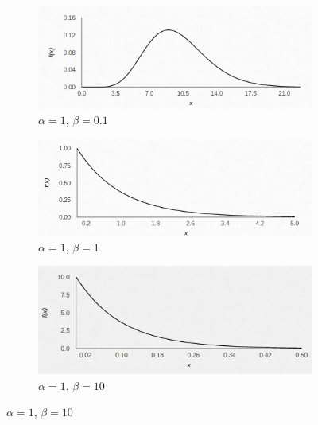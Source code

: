 \documentclass[a4paper,12pt]{article} %
\begin{document}
\begin{figure}[H]
	\begin{subfigure}{.4\textwidth}
		\centering
		\includegraphics[width=.8\linewidth]{Gamma/Gamma_alp1_bet01.png}
		\caption{$\alpha = 1 $, $\beta = 0.1 $}
	\end{subfigure}%
	\begin{subfigure}{.4\textwidth}
		\centering
		\includegraphics[width=.8\linewidth]{Gamma/Gamma_alp1_bet1.png}
		\caption{$\alpha = 1 $, $\beta = 1 $}
	\end{subfigure}%
	
	
	\begin{subfigure}{.4\textwidth}
		\centering
		\includegraphics[width=.8\linewidth]{Gamma/Gamma_alp1_bet10.png}
		\caption{$\alpha = 1 $, $\beta = 10 $}
	\end{subfigure}%
	

\end{figure}
\end{document}
